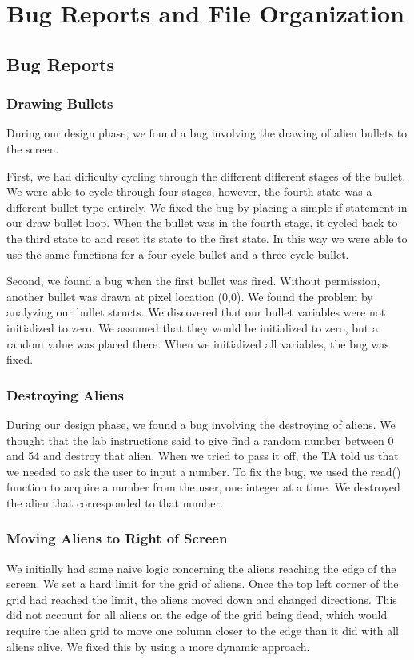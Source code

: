 \documentclass[11pt,letter,oneside]{report}
\begin{document}
\chapter{Bug Reports and File Organization}

\section{Bug Reports}

\subsection{Drawing Bullets}
During our design phase, we found a bug involving the drawing of alien bullets to the screen. 

First, we had difficulty cycling through the different different stages of the bullet. We were able to cycle through four stages, however, the fourth state was a different bullet type entirely. We fixed the bug by placing a simple if statement in our draw bullet loop. When the bullet was in the fourth stage, it cycled back to the third state to and reset its state to the first state. In this way we were able to use the same functions for a four cycle bullet and a three cycle bullet.

Second, we found a bug when the first bullet was fired. Without permission, another bullet was drawn at pixel location (0,0). We found the problem by analyzing our bullet structs. We discovered that our bullet variables were not initialized to zero. We assumed that they would be initialized to zero, but a random value was placed there. When we initialized all variables, the bug was fixed.

\subsection{Destroying Aliens}
During our design phase, we found a bug involving the destroying of aliens. We thought that the lab instructions said to give find a random number between 0 and 54 and destroy that alien. When we tried to pass it off, the TA told us that we needed to ask the user to input a number. To fix the bug, we used the read() function to acquire a number from the user, one integer at a time. We destroyed the alien that corresponded to that number.

\subsection{Moving Aliens to Right of Screen}
We initially had some naive logic concerning the aliens reaching the edge of the screen.  We set a hard limit for the grid of aliens.  Once the top left corner of the grid had reached the limit, the aliens moved down and changed directions.  This did not account for all aliens on the edge of the grid being dead, which would require the alien grid to move one column closer to the edge than it did with all aliens alive.  We fixed this by using a more dynamic approach.
\end{document}
